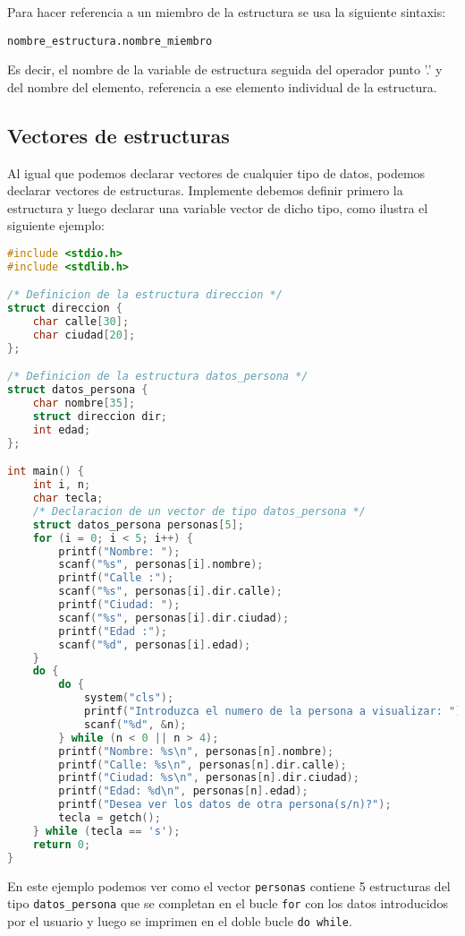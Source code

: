 Para hacer referencia a un miembro de la estructura se usa la siguiente sintaxis:

\texttt{nombre\_estructura.nombre\_miembro}

Es decir, el nombre de la variable de estructura seguida del operador punto '.' y del nombre del elemento, referencia a ese elemento individual de la estructura.

\subsection{Vectores de estructuras}{
Al igual que podemos declarar vectores de cualquier tipo de datos, podemos declarar vectores de estructuras. Implemente debemos definir primero la estructura y luego declarar una variable vector de dicho tipo, como ilustra el siguiente ejemplo:
\begin{Ejemplo}
\begin{lstlisting}[language=C]
#include <stdio.h>
#include <stdlib.h>

/* Definicion de la estructura direccion */
struct direccion {
    char calle[30];
    char ciudad[20];
};

/* Definicion de la estructura datos_persona */
struct datos_persona {
    char nombre[35];
    struct direccion dir;
    int edad;
};

int main() {
    int i, n;
    char tecla;
    /* Declaracion de un vector de tipo datos_persona */
    struct datos_persona personas[5];
    for (i = 0; i < 5; i++) {
        printf("Nombre: ");
        scanf("%s", personas[i].nombre);
        printf("Calle :");
        scanf("%s", personas[i].dir.calle);
        printf("Ciudad: ");
        scanf("%s", personas[i].dir.ciudad);
        printf("Edad :");
        scanf("%d", personas[i].edad);
    }
    do {
        do {
            system("cls");
            printf("Introduzca el numero de la persona a visualizar: ");
            scanf("%d", &n);
        } while (n < 0 || n > 4);
        printf("Nombre: %s\n", personas[n].nombre);
        printf("Calle: %s\n", personas[n].dir.calle);
        printf("Ciudad: %s\n", personas[n].dir.ciudad);
        printf("Edad: %d\n", personas[n].edad);
        printf("Desea ver los datos de otra persona(s/n)?");
        tecla = getch();
    } while (tecla == 's');
    return 0;
}
\end{lstlisting}
\Explicacion
En este ejemplo podemos ver como el vector \texttt{personas} contiene 5 estructuras del tipo \texttt{datos\_persona} que se completan en el bucle \texttt{for} con los datos introducidos por el usuario y luego se imprimen en el doble bucle \texttt{do while}.
\end{Ejemplo}
}
